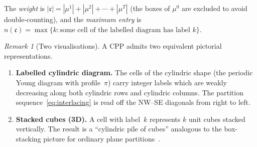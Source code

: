 \documentclass[11pt]{article}
\theoremstyle{plain}
\theoremstyle{definition}
\theoremstyle{remark}
\newtheorem{remark}[theorem]{Remark}
\begin{document}
The \emph{weight} is
$|\mathfrak{c}| = |\mu^1| + |\mu^2| + \cdots + |\mu^T|$
(the boxes of $\mu^0$ are excluded to avoid double-counting),
and the \emph{maximum entry} is
$n(\mathfrak{c}) = \max\{k : \text{some cell of the labelled
diagram has label } k\}$.

\begin{remark}[Two visualisations]\label{rem:visualisations}
A CPP admits two equivalent pictorial representations.
\begin{enumerate}
\item \textbf{Labelled cylindric diagram.}
  The cells of the cylindric shape (the periodic Young diagram
  with profile~$\pi$) carry integer labels which are weakly
  decreasing along both cylindric rows and cylindric columns.
  The partition sequence~\eqref{eq:interlacing} is read off
  the NW--SE diagonals from right to left.

\begin{center}
\end{center}

\item \textbf{Stacked cubes (3D).}
  A cell with label~$k$ represents $k$ unit cubes stacked
  vertically.  The result is a ``cylindric pile of cubes''
  analogous to the box-stacking picture for ordinary plane
  partitions~\cite{borodin-2007}.

\begin{center}
\end{center}
\end{enumerate}
\end{remark}
\end{document}
